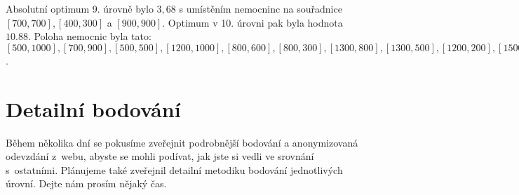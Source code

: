 \documentclass[12pt,a4paper]{article}
\begin{document}
Absolutní optimum 9. úrovně bylo $3,68$ s umístěním nemocninc na souřadnice $[700, 700], [400, 300]$ a $[900, 900]$.
Optimum v 10. úrovni pak byla hodnota $10.88$. Poloha nemocnic byla tato: $[500,1000],[700,900],[500,500],[1200,1000],[800, 600],[800,300],[1300,800],[1300,500],[1200, 200],[1500,100]$.
\section*{Detailní bodování}

Během několika dní se pokusíme zveřejnit podrobnější bodování a anonymizovaná
odevzdání z~webu, abyste se mohli podívat, jak jste si vedli ve srovnání
s~ostatními. Plánujeme také zveřejnil detailní metodiku bodování jednotlivých
úrovní. Dejte nám prosím nějaký čas.
\end{document}
